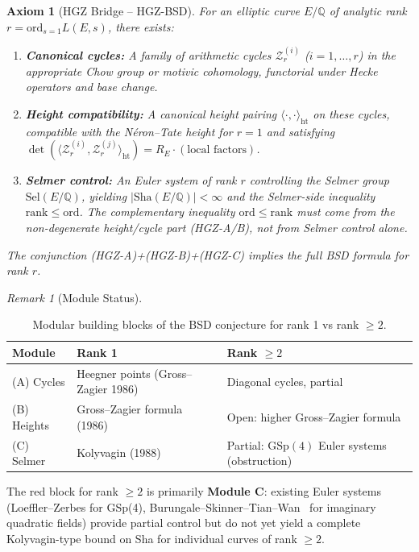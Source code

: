 \documentclass[aps,prd,twocolumn,superscriptaddress,nofootinbib,floatfix]{revtex4-2}
\newtheorem{axiom}[theorem]{Axiom}
\theoremstyle{definition}
\theoremstyle{remark}
\newtheorem{remark}[theorem]{Remark}
\begin{document}
\begin{axiom}[HGZ Bridge -- HGZ-BSD]\label{ax:hgz-bsd}
For an elliptic curve $E/\mathbb{Q}$ of analytic rank $r = \mathrm{ord}_{s=1} L(E,s)$, there exists:
\begin{enumerate}
\item[(HGZ-A)] \textbf{Canonical cycles:} A family of arithmetic cycles $\mathcal{Z}_r^{(i)}$ ($i = 1, \ldots, r$) in the appropriate Chow group or motivic cohomology, functorial under Hecke operators and base change.
\item[(HGZ-B)] \textbf{Height compatibility:} A canonical height pairing $\langle \cdot, \cdot \rangle_{\mathrm{ht}}$ on these cycles, compatible with the Néron--Tate height for $r=1$ and satisfying $\det(\langle \mathcal{Z}_r^{(i)}, \mathcal{Z}_r^{(j)} \rangle_{\mathrm{ht}}) = R_E \cdot (\text{local factors})$.
\item[(HGZ-C)] \textbf{Selmer control:} An Euler system of rank $r$ controlling the Selmer group $\mathrm{Sel}(E/\mathbb{Q})$, yielding $|\mathrm{Sha}(E/\mathbb{Q})| < \infty$ and the Selmer-side inequality $\mathrm{rank} \leq \mathrm{ord}$. The complementary inequality $\mathrm{ord} \leq \mathrm{rank}$ must come from the non-degenerate height/cycle part (HGZ-A/B), not from Selmer control alone.
\end{enumerate}
The conjunction (HGZ-A)+(HGZ-B)+(HGZ-C) implies the full BSD formula for rank $r$.
\end{axiom}

\begin{remark}[Module Status]\label{rem:hgz-modules}
\begin{table}[t]
\centering
\small
\caption{Modular building blocks of the BSD conjecture for rank 1 vs rank $\geq 2$.}
\label{tab:module_comparison}
\begin{tabular*}{\textwidth}{@{\extracolsep{\fill}}lll@{}}
\toprule
\textbf{Module} & \textbf{Rank 1} & \textbf{Rank $\geq 2$} \\
\midrule
(A) Cycles & Heegner points (Gross--Zagier 1986) & Diagonal cycles, partial \\
\addlinespace
(B) Heights & Gross--Zagier formula (1986) & Open: higher Gross--Zagier formula \\
\addlinespace
(C) Selmer & Kolyvagin (1988) & Partial: $\mathrm{GSp}(4)$ Euler systems (obstruction) \\
\bottomrule
\end{tabular*}
\end{table}
The red block for rank $\geq 2$ is primarily \textbf{Module C}: existing Euler systems (Loeffler--Zerbes for GSp(4), Burungale--Skinner--Tian--Wan~\cite{BSTW2024} for imaginary quadratic fields) provide partial control but do not yet yield a complete Kolyvagin-type bound on Sha for individual curves of rank $\geq 2$.
\end{remark}
\end{document}
